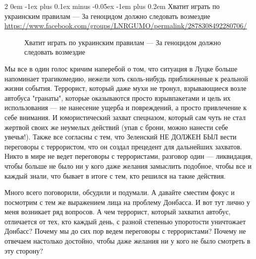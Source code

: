 \documentclass[a4paper,11pt]{extreport}
\makeatletter
\renewcommand\subsection{%
  \clearpage
    \@startsection{subsection}%
    {2}%
    {0em}%
    {-1ex plus 0.1ex minus -0.05ex}%
    {-1em plus 0.2em}%
    {\scshape\bfseries\Large}%
}
\makeatother
\begin{document}
 
 
  
\clearpage
\subsection{Хватит играть по украинским правилам --- За геноцидом должно следовать возмездие}
\label{sec:26_07_2020.fb.lnr.6}
\url{https://www.facebook.com/groups/LNRGUMO/permalink/2878308492280706/}



\begin{figure}[ht]
 \centering
 \caption{Хватит играть по украинским правилам --- За геноцидом должно следовать возмездие}
 \label{fig:}
\end{figure}

Мы все в один голос кричим наперебой о том, что ситуация в Луцке больше
напоминает трагикомедию, нежели хоть сколь-нибудь приближенные к реальной жизни
события. Террорист, который даже мухи не тронул, взрывающиеся возле автобуса
"гранаты", которые оказываются просто взрывпакетами и цель их использования —
не нанесение ущерба и повреждений, а просто привлечение к себе внимания. И
юмористический захват спецназом, который сам чуть не стал жертвой своих же
неумелых действий (упав с брони, можно нанести себе увечья!). Также все
согласны с тем, что Зеленский НЕ ДОЛЖЕН БЫЛ вести переговоры с террористом, что
он создал прецедент для дальнейших захватов. Никто в мире не ведет переговоры с
террористами, разговор один --- ликвидация, чтобы больше не было ни у кого даже
желания замыслить подобное, чтобы все и каждый знали, что бывает в итоге с тем,
кто решился на такие действия.

Много всего поговорили, обсудили и подумали. А давайте сместим фокус и
посмотрим с тем же выражением лица на проблему Донбасса. И вот тут лично у меня
возникает ряд вопросов. А чем террорист, который захватил автобус, отличается
от тех, кто каждый день, с разной степенью упоротости уничтожает Донбасс?
Почему мы до сих пор ведем переговоры с террористами? Почему не отвечаем
настолько достойно, чтобы даже желания ни у кого не было смотреть в эту
сторону?
\end{document}
